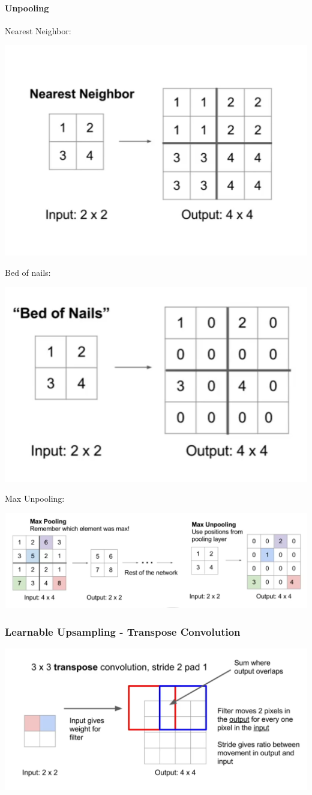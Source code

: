 \paragraph{Unpooling}

Nearest Neighbor:

\includegraphics[width=0.5\columnwidth]{fei_fei_li/lecture_11/nn_uppooling.png}

Bed of nails:

\includegraphics[width=0.5\columnwidth]{fei_fei_li/lecture_11/bed_of_nails.png}

Max Unpooling:

\includegraphics[width=0.5\columnwidth]{fei_fei_li/lecture_11/max_unpooling.png}

\subsubsection{Learnable Upsampling - Transpose Convolution }

\includegraphics[width=0.5\columnwidth]{fei_fei_li/lecture_11/learnable_conv.png}

